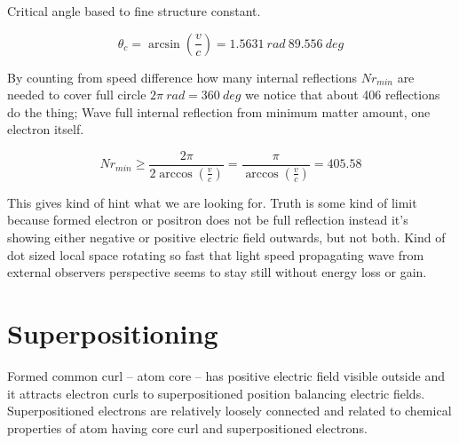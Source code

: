 


Critical angle based to fine structure constant.

\begin{equation} \label{eq:critical_angle}
	\theta_c= \arcsin(\frac{v}{c}) = 1.5631~rad~89.556~deg
\end{equation}


By counting from speed difference how many internal reflections $Nr_{min}$
are needed to cover full circle $2\pi~rad = 360~deg$ we notice that about
406 reflections do the thing; Wave full internal reflection from minimum
matter amount, one electron itself.

\begin{equation} \label{eq:minimum_number_of_reflections}
	Nr_{min}\geq
	\frac {2\pi}{2\arccos(\frac{v}{c})}
	=\frac {\pi}{\arccos(\frac{v}{c})}
	= 405.58
\end{equation}

This gives kind of hint what we are looking for. Truth is some kind of limit
because formed electron or positron does not be full reflection instead it's
showing either negative or positive electric field outwards, but not both.
Kind of dot sized local space rotating so fast that light speed propagating
wave from external observers perspective seems to stay still without energy
loss or gain.

\section{Superpositioning}
\label{superpositioning}

Formed common curl -- atom core -- has positive electric field visible outside
and it attracts electron curls to superpositioned position balancing electric
fields. Superpositioned electrons are relatively loosely connected and related
to chemical properties of atom having core curl and superpositioned electrons.

